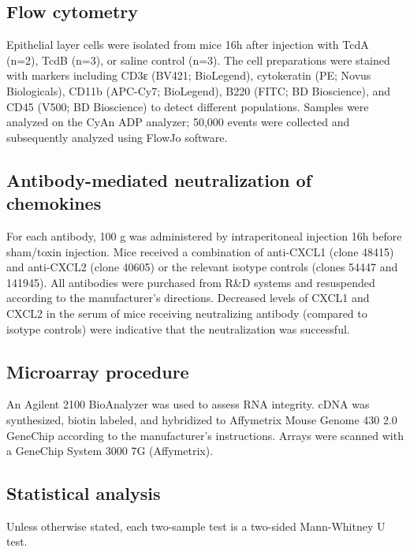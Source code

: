 \subsection{ Flow cytometry }
Epithelial layer cells were isolated from mice 16h after injection 
with TcdA (n=2), TcdB (n=3), or saline control (n=3). The cell preparations 
were stained with markers including CD3ε (BV421; BioLegend), cytokeratin 
(PE; Novus Biologicals), CD11b (APC-Cy7; BioLegend), B220 (FITC; BD Bioscience), 
and CD45 (V500; BD Bioscience) to detect different populations.  Samples 
were analyzed on the CyAn ADP analyzer; 50,000 events were collected and 
subsequently analyzed using FlowJo software.  

\subsection{Antibody-mediated neutralization of chemokines}
For each antibody, 100 \textmugreek{}g was administered by intraperitoneal 
injection 16h before sham/toxin injection. Mice received a combination 
of anti-CXCL1 (clone 48415) and anti-CXCL2 (clone 40605) or the relevant 
isotype controls (clones 54447 and 141945). All antibodies were 
purchased from R\&{}D systems and resuspended according to the manufacturer's 
directions. Decreased levels of CXCL1 and CXCL2 in the serum of mice 
receiving neutralizing antibody (compared to isotype controls) were 
indicative that the neutralization was successful.

\subsection{ Microarray procedure }
An Agilent 2100 BioAnalyzer was used to assess RNA integrity. cDNA 
was synthesized, biotin labeled, and hybridized to Affymetrix Mouse 
Genome 430 2.0 GeneChip according to the manufacturer's instructions. 
Arrays were scanned with a GeneChip System 3000 7G (Affymetrix).

\subsection{ Statistical analysis }
Unless otherwise stated, each two-sample test is a two-sided Mann-Whitney U test.


